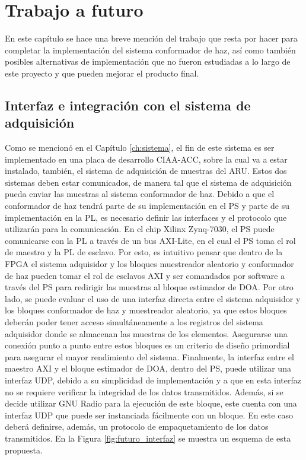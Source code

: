 \chapter{Trabajo a futuro}\label{ch:futuro}

En este capítulo se hace una breve mención del trabajo que resta por hacer para completar la implementación del sistema conformador de haz, así como también posibles alternativas de implementación que no fueron estudiadas a lo largo de este proyecto y que pueden mejorar el producto final.

\section{Interfaz e integración con el sistema de adquisición}\label{subc:futuro_interfaz}
Como se mencionó en el Capítulo \ref{ch:sistema}, el fin de este sistema es ser implementado en una placa de desarrollo CIAA-ACC, sobre la cual va a estar instalado, también, el sistema de adquisición de muestras del ARU. Estos dos sistemas deben estar comunicados, de manera tal que el sistema de adquisición pueda enviar las muestras al sistema conformador de haz. Debido a que el conformador de haz tendrá parte de su implementación en el PS y parte de su implementación en la PL, es necesario definir las interfaces y el protocolo que utilizarán para la comunicación. En el chip Xilinx Zynq-7030, el PS puede comunicarse con la PL a través de un bus AXI-Lite, en el cual el PS toma el rol de maestro y la PL de esclavo. Por esto, es intuitivo pensar que dentro de la FPGA el sistema adquisidor y los bloques muestreador aleatorio y conformador de haz pueden tomar el rol de esclavos AXI y ser comandados por software a través del PS para redirigir las muestras al bloque estimador de DOA. Por otro lado, se puede evaluar el uso de una interfaz directa entre el sistema adquisidor y los bloques conformador de haz y muestreador aleatorio, ya que estos bloques deberán poder tener acceso simultáneamente a los registros del sistema adquisidor donde se almacenan las muestras de los elementos. Asegurarse una conexión punto a punto entre estos bloques es un criterio de diseño primordial para asegurar el mayor rendimiento del sistema. Finalmente, la interfaz entre el maestro AXI y el bloque estimador de DOA, dentro del PS, puede utilizar una interfaz UDP, debido a su simplicidad de implementación y a que en esta interfaz no se requiere verificar la integridad de los datos transmitidos. Además, si se decide utilizar GNU Radio para la ejecución de este bloque, este cuenta con una interfaz UDP que puede ser instanciada fácilmente con un bloque. En este caso deberá definirse, además, un protocolo de empaquetamiento de los datos transmitidos. En la Figura \ref{fig:futuro_interfaz} se muestra un esquema de esta propuesta.

